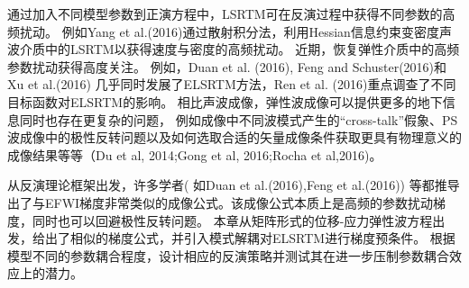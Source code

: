 通过加入不同模型参数到正演方程中，LSRTM可在反演过程中获得不同参数的高频扰动。
例如Yang et
al.(2016)\cite{Yang2016}通过散射积分法，利用Hessian信息约束变密度声波介质中的LSRTM以获得速度与密度的高频扰动。
近期，恢复弹性介质中的高频参数扰动获得高度关注。
例如，Duan et al. (2016)\cite{Duan2016}, Feng and Schuster(2016)\cite{Feng2016}和Xu et al.(2016)
\cite{Xu2016}几乎同时发展了ELSRTM方法，Ren et al. (2016)\cite{RenEtAl2016}重点调查了不同目标函数对ELSRTM的影响。
相比声波成像，弹性波成像可以提供更多的地下信息同时也存在更复杂的问题，
例如成像中不同波模式产生的“cross-talk”假象、PS波成像中的极性反转问题以及如何选取合适的矢量成像条件获取更具有物理意义的成像结果等等（Du et al,
2014\cite{DuEtAl2014};Gong et
al, 2016\cite{GongEtAl2016};Rocha et al,2016\cite{RochaEtAl2016a})。

从反演理论框架出发，许多学者(
如Duan et al.(2016)\cite{Duan2016},Feng et
al.(2016)\cite{Feng2016})
等都推导出了与EFWI梯度非常类似的成像公式。该成像公式本质上是高频的参数扰动梯度，同时也可以回避极性反转问题。
本章从矩阵形式的位移-应力弹性波方程出发，给出了相似的梯度公式，并引入模式解耦对ELSRTM进行梯度预条件。
根据模型不同的参数耦合程度，设计相应的反演策略并测试其在进一步压制参数耦合效应上的潜力。

